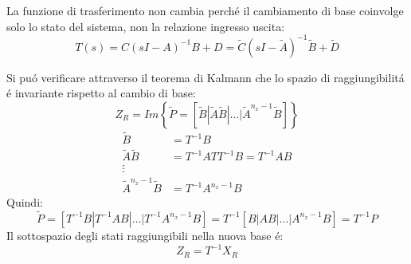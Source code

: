 \documentclass[../main.tex]{subfiles}
\begin{document}
		La funzione di trasferimento non cambia perch\'e il cambiamento di base coinvolge solo lo stato del sistema, non la relazione ingresso uscita:
		\[ T(s) = C(sI-A)^{-1}B+D = \tilde C (sI-\tilde A)^{-1} \tilde B + \tilde D \]
		
		Si pu\'o verificare attraverso il teorema di Kalmann che lo spazio di raggiungibilit\'a \'e invariante rispetto al cambio di base:
		\[ Z_R = Im\left\lbrace \tilde P = \left[ \tilde B | \tilde A \tilde B | \dots | \tilde A^{n_x-1} \tilde B \right] \right\rbrace \]
		\begin{align*}
			\tilde B &= T^{-1} B\\
			\tilde A \tilde B &= T^{-1}AT T^{-1}B = T^{-1}AB\\
			\vdots\\
			\tilde A^{n_x-1} \tilde B &= T^{-1}A^{n_x-1}B
		\end{align*}
		Quindi:
		\[ \tilde P = \left[ T^{-1} B | T^{-1} AB | \dots | T^{-1} A^{n_x-1}B \right] = T^{-1} \left[ B | AB | \dots | A^{n_x-1}B \right] = T^{-1}P \]
		Il sottospazio degli stati raggiungibili nella nuova base \'e:
		\[ Z_R = T^{-1} X_R \]
		
\end{document}
